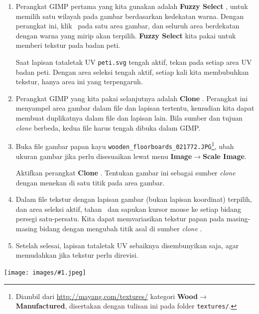 \documentclass[11pt]{report}
\newcommand{\fig}[1]{
  \begingroup
  \centering
  \texttt{[image: images/\#1.jpeg]}
  \label{fig:#1}
  \endgroup
}
\def\key#1{\fbox{\bfseries\ttfamily#1}}
\def\ke{$\to$}
\def\mki{\fbox{MKi}}
\begin{document}
\begin{enumerate}
\item Perangkat GIMP pertama yang kita gunakan adalah \textbf{Fuzzy Select} \key{U}, untuk memilih satu wilayah pada gambar berdasarkan kedekatan warna. Dengan perangkat ini, klik \mki\ pada satu area gambar, dan seluruh area berdekatan dengan warna yang mirip akan terpilih. \textbf{Fuzzy Select} kita pakai untuk memberi tekstur pada badan peti.

  Saat lapisan tataletak UV \texttt{peti.svg} tengah aktif, tekan \key{Shift-\mki} pada setiap area UV badan peti. Dengan area seleksi tengah aktif, setiap kali kita membubuhkan tekstur, hanya area ini yang terpengaruh.

\item Perangkat GIMP yang kita pakai selanjutnya adalah \textbf{Clone} \key{C}. Perangkat ini menyampel area gambar dalam file dan lapisan tertentu, kemudian kita dapat membuat duplikatnya dalam file dan lapisan lain. Bila sumber dan tujuan \emph{clone} berbeda, kedua file harus tengah dibuka dalam GIMP.

\item Buka file gambar papan kayu \texttt{wooden\_floorboards\_021772.JPG}\footnote{Diambil dari \url{http://mayang.com/textures/} kategori \textbf{Wood}\ke\textbf{Manufactured}, disertakan dengan tulisan ini pada folder \texttt{textures/}.}, ubah ukuran gambar jika perlu disesuaikan lewat menu \textbf{Image}\ke\textbf{Scale Image}.

  Aktifkan perangkat \textbf{Clone} \key{C}. Tentukan gambar ini sebagai sumber \emph{clone} dengan menekan \key{Ctrl-\mki} di satu titik pada area gambar.  

\item Dalam file tekstur dengan lapisan gambar (bukan lapisan koordinat) terpilih, dan area seleksi aktif, tahan \mki\ dan sapukan kursor mouse ke setiap bidang persegi satu-persatu. Kita dapat memvariasikan tekstur papan pada masing-masing bidang dengan mengubah titik asal di sumber \emph{clone} \key{Ctrl-\mki}.

\item Setelah selesai, lapisan tataletak UV sebaiknya disembunyikan saja, agar memudahkan jika tekstur perlu direvisi.
\end{enumerate}

\fig{gimp-003}
\end{document}

